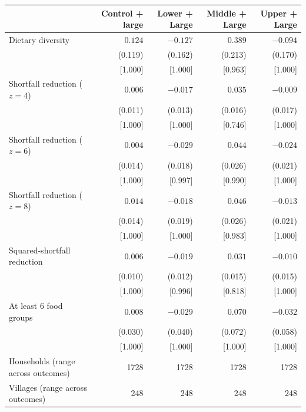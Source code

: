 \begin{tabular}{lrrrr}
\toprule
 & Control  +  large & Lower + Large & Middle + Large & Upper + Large \\
\midrule
Dietary diversity & $0.124$ & $-0.127$ & $0.389$ & $-0.094$ \\
 & (0.119) & (0.162) & (0.213) & (0.170) \\
 & [1.000] & [1.000] & [0.963] & [1.000] \\
Shortfall reduction ($z=4$) & $0.006$ & $-0.017$ & $0.035$ & $-0.009$ \\
 & (0.011) & (0.013) & (0.016) & (0.017) \\
 & [1.000] & [1.000] & [0.746] & [1.000] \\
Shortfall reduction ($z=6$) & $0.004$ & $-0.029$ & $0.044$ & $-0.024$ \\
 & (0.014) & (0.018) & (0.026) & (0.021) \\
 & [1.000] & [0.997] & [0.990] & [1.000] \\
Shortfall reduction ($z=8$) & $0.014$ & $-0.018$ & $0.046$ & $-0.013$ \\
 & (0.014) & (0.019) & (0.026) & (0.021) \\
 & [1.000] & [1.000] & [0.983] & [1.000] \\
Squared-shortfall reduction & $0.006$ & $-0.019$ & $0.031$ & $-0.010$ \\
 & (0.010) & (0.012) & (0.015) & (0.015) \\
 & [1.000] & [0.996] & [0.818] & [1.000] \\
At least 6 food groups & $0.008$ & $-0.029$ & $0.070$ & $-0.032$ \\
 & (0.030) & (0.040) & (0.072) & (0.058) \\
 & [1.000] & [1.000] & [1.000] & [1.000] \\
Households (range across outcomes) & 1728 & 1728 & 1728 & 1728 \\
Villages (range across outcomes) & 248 & 248 & 248 & 248 \\
\bottomrule
\end{tabular}
